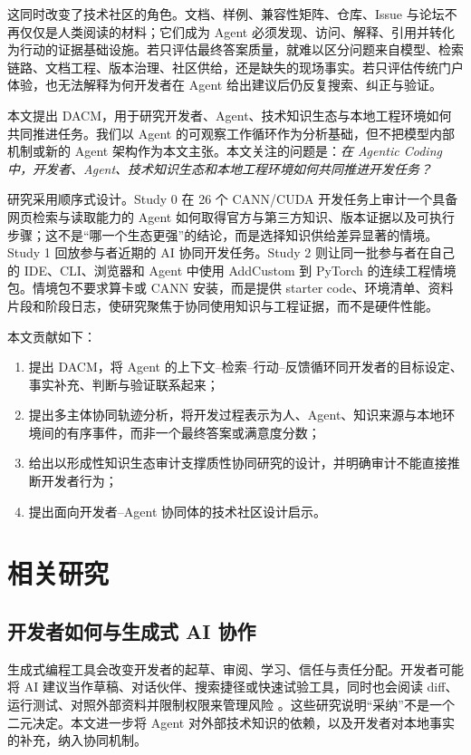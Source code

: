 \documentclass[manuscript,review,anonymous]{acmart}
\begin{document}
这同时改变了技术社区的角色。文档、样例、兼容性矩阵、仓库、Issue 与论坛不再仅仅是人类阅读的材料；它们成为 Agent 必须发现、访问、解释、引用并转化为行动的证据基础设施。若只评估最终答案质量，就难以区分问题来自模型、检索链路、文档工程、版本治理、社区供给，还是缺失的现场事实。若只评估传统门户体验，也无法解释为何开发者在 Agent 给出建议后仍反复搜索、纠正与验证。

本文提出 DACM，用于研究开发者、Agent、技术知识生态与本地工程环境如何共同推进任务。我们以 Agent 的可观察工作循环作为分析基础，但不把模型内部机制或新的 Agent 架构作为本文主张。本文关注的问题是：\emph{在 Agentic Coding 中，开发者、Agent、技术知识生态和本地工程环境如何共同推进开发任务？}

研究采用顺序式设计。Study 0 在 26 个 CANN/CUDA 开发任务上审计一个具备网页检索与读取能力的 Agent 如何取得官方与第三方知识、版本证据以及可执行步骤；这不是“哪一个生态更强”的结论，而是选择知识供给差异显著的情境。Study 1 回放参与者近期的 AI 协同开发任务。Study 2 则让同一批参与者在自己的 IDE、CLI、浏览器和 Agent 中使用 AddCustom 到 PyTorch 的连续工程情境包。情境包不要求算卡或 CANN 安装，而是提供 starter code、环境清单、资料片段和阶段日志，使研究聚焦于协同使用知识与工程证据，而不是硬件性能。

本文贡献如下：
\begin{enumerate}[leftmargin=*]
  \item 提出 DACM，将 Agent 的上下文--检索--行动--反馈循环同开发者的目标设定、事实补充、判断与验证联系起来；
  \item 提出多主体协同轨迹分析，将开发过程表示为人、Agent、知识来源与本地环境间的有序事件，而非一个最终答案或满意度分数；
  \item 给出以形成性知识生态审计支撑质性协同研究的设计，并明确审计不能直接推断开发者行为；
  \item 提出面向开发者--Agent 协同体的技术社区设计启示。
\end{enumerate}

\section{相关研究}

\subsection{开发者如何与生成式 AI 协作}

生成式编程工具会改变开发者的起草、审阅、学习、信任与责任分配。开发者可能将 AI 建议当作草稿、对话伙伴、搜索捷径或快速试验工具，同时也会阅读 diff、运行测试、对照外部资料并限制权限来管理风险 \cite{barke2023grounded,vaithilingam2022expectation}。这些研究说明“采纳”不是一个二元决定。本文进一步将 Agent 对外部技术知识的依赖，以及开发者对本地事实的补充，纳入协同机制。
\end{document}
